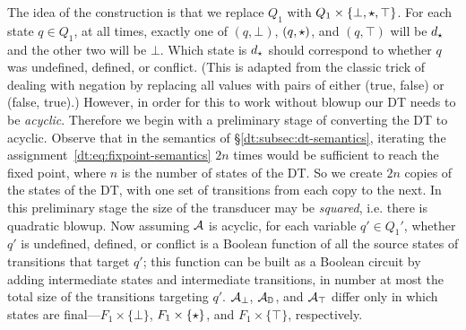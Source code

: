 The idea of the construction is that we replace $Q_1$ with $Q_1 \times \{\bot, \star,\top\}$. For each state $q \in Q_1$, at all times, exactly one of $(q, \bot)$, $(q, \star)$, and $(q, \top)$ will be $d_\star$ and the other two will be $\bot$. Which state is $d_\star$ should correspond to whether $q$ was undefined, defined, or conflict. (This is adapted from the classic trick of dealing with negation by replacing all values with pairs of either (true, false) or (false, true).) However, in order for this to work without blowup our DT needs to be \emph{acyclic}. Therefore we begin with a preliminary stage of converting the DT to acyclic. Observe that in the semantics of \S\ref{dt:subsec:dt-semantics}, iterating the assignment~\eqref{dt:eq:fixpoint-semantics} $2n$ times would be sufficient to reach the fixed point, where $n$ is the number of states of the DT. So we create $2n$ copies of the states of the DT, with one set of transitions from each copy to the next. In this preliminary stage the size of the transducer may be \emph{squared}, i.e. there is quadratic blowup. Now assuming $\mathcal{A}$ is acyclic, for each variable $q' \in Q_1'$, whether $q'$ is undefined, defined, or conflict is a Boolean function of all the source states of transitions that target $q'$; this function can be built as a Boolean circuit by adding intermediate states and intermediate transitions, in number at most the total size of the transitions targeting $q'$.
$\mathcal{A}_\bot$, $\mathcal{A}_{\mathbb{D}}$, and $\mathcal{A}_\top$ differ only in which states are final---$F_1 \times \{\bot\}$, $F_1 \times \{\star\}$, and $F_1 \times \{\top\}$, respectively.

%

